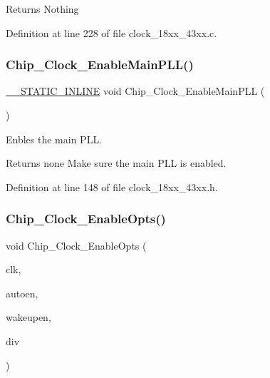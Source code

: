 \begin{DoxyReturn}{Returns}
Nothing 
\end{DoxyReturn}


Definition at line 228 of file clock\+\_\+18xx\+\_\+43xx.\+c.

\mbox{\label{group___c_l_o_c_k__18_x_x__43_x_x_gaf6a067bb264ab963d7f81eaa24ce9ec0}} 
\subsubsection{\texorpdfstring{Chip\+\_\+\+Clock\+\_\+\+Enable\+Main\+P\+L\+L()}{Chip\_Clock\_EnableMainPLL()}}
{\footnotesize\ttfamily \hyperlink{cmsis__iccarm_8h_aba87361bfad2ae52cfe2f40c1a1dbf9c}{\+\_\+\+\_\+\+S\+T\+A\+T\+I\+C\+\_\+\+I\+N\+L\+I\+NE} void Chip\+\_\+\+Clock\+\_\+\+Enable\+Main\+P\+LL (\begin{DoxyParamCaption}\item[{void}]{ }\end{DoxyParamCaption})}



Enbles the main P\+LL. 

\begin{DoxyReturn}{Returns}
none Make sure the main P\+LL is enabled. 
\end{DoxyReturn}


Definition at line 148 of file clock\+\_\+18xx\+\_\+43xx.\+h.

\mbox{\label{group___c_l_o_c_k__18_x_x__43_x_x_gadfa0a46d347a3174c7f67edbaf3a66f8}} 
\subsubsection{\texorpdfstring{Chip\+\_\+\+Clock\+\_\+\+Enable\+Opts()}{Chip\_Clock\_EnableOpts()}}
{\footnotesize\ttfamily void Chip\+\_\+\+Clock\+\_\+\+Enable\+Opts (\begin{DoxyParamCaption}\item[{\hyperlink{chip__clocks_8h_a45bb23228b9831321626c103ada7c60b}{C\+H\+I\+P\+\_\+\+C\+C\+U\+\_\+\+C\+L\+K\+\_\+T}}]{clk,  }\item[{bool}]{autoen,  }\item[{bool}]{wakeupen,  }\item[{int}]{div }\end{DoxyParamCaption})}



